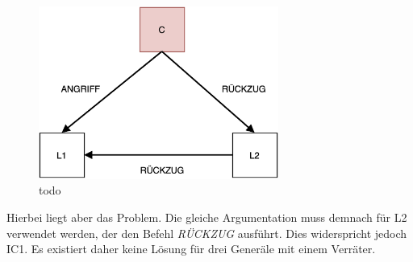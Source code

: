 \documentclass{article}
\begin{document}
\begin{figure}[H]
    \centering
    \includegraphics[width=0.7\textwidth]{general2.png}
    \caption{todo}
    \label{fig:general2}
\end{figure}

Hierbei liegt aber das Problem. Die gleiche Argumentation muss demnach für L2
verwendet werden, der den Befehl \textit{RÜCKZUG} ausführt. Dies widerspricht jedoch 
IC1. Es existiert daher keine Lösung für drei Generäle mit einem Verräter.  

\end{document}
